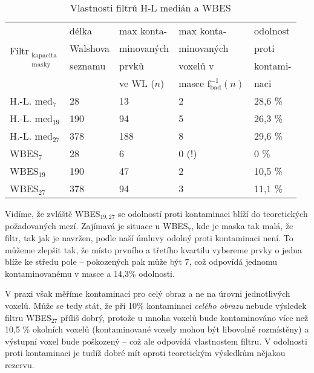 \begin{table}[h]
    \begin{center}
    \begin{tabular}{lllll}
      \toprule
      \multirow{4}{*}{Filtr$_{\mathrm{\substack{kapacita\\ masky}}}$}
                                        &délka   & max konta-  & max konta- & odolnost    \\
                                        &Walshova& minovaných  & minovaných & proti       \\
                                        &seznamu & prvků       & voxelů v   & kontami-    \\
                                        &        & ve WL ($n$) & masce $\mathrm{f_{bad}^{-1}}(n)$ & naci \\
      \midrule
      H.-L. med$_{\mathrm{7}}$          & 28  & 13  & 2                 & 28,6 \%      \\
      H.-L. med$_{\mathrm{19}}$         & 190 & 94  & 5                 & 26,3 \%      \\
      H.-L. med$_{\mathrm{27}}$         & 378 & 188 & 8                 & 29,6 \%      \\
      WBES$_{\mathrm{7}}$               & 28  & 6   & 0 (!)             & 0 \%         \\
      WBES$_{\mathrm{19}}$              & 190 & 47  & 2                 & 10,5 \%      \\
      WBES$_{\mathrm{27}}$              & 378 & 94  & 3                 & 11,1 \%      \\
      \bottomrule
    \end{tabular}
    \caption{Vlastnosti filtrů H-L medián a WBES}
    \end{center}
\end{table}\label{tab WBES}

     Vidíme, že zvláště WBES$_{\mathrm{19,27}}$ se odolností proti kontaminaci blíží do teoretických požadovaných mezí. Zajímavá je situace u WBES$_{\mathrm{7}}$, kde je maska tak malá, že filtr, tak jak je navržen, podle naší úmluvy odolný proti kontaminaci není. To můžeme zlepšit tak, že místo prvního a třetího kvartilu vybereme prvky o jedna blíže ke středu pole -- pokozených pak může být 7, což odpovídá jednomu kontaminovanému v masce a 14,3\% odolnosti.
     \vspace{0.5cm}

     V praxi však měříme kontaminaci pro celý obraz a ne na úrovni jednotlivých voxelů. Může se tedy stát, že při 10\% kontaminaci \emph{celého obrazu} nebude výsledek filtru WBES$_{\mathrm{27}}$ příliš dobrý, protože u mnoha voxelů bude kontaminováno více než 10,5 \% okolních voxelů (kontaminované voxely mohou být libovolně rozmístěny) a výstupní voxel bude poškozený -- což ale odpovídá vlastnostem filtru. V odolnosti proti kontaminaci je tudíž dobré mít oproti teoretickým výsledkům nějakou rezervu.

